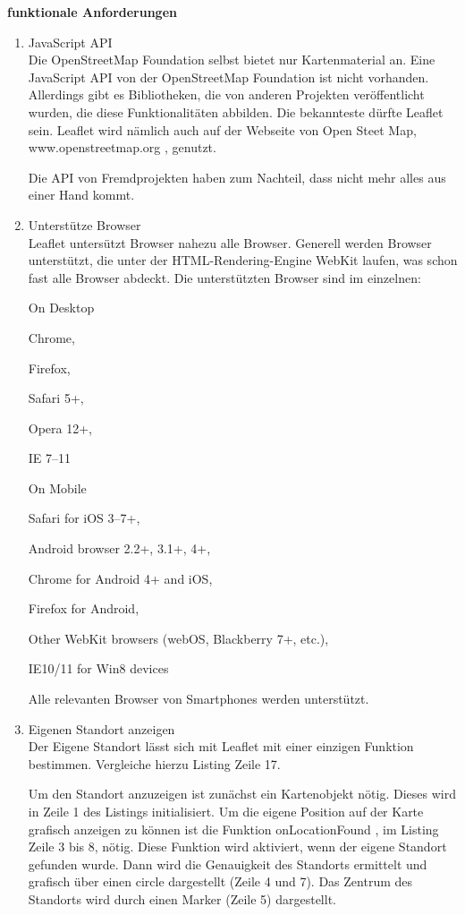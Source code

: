 \textbf{funktionale Anforderungen}
\begin{enumerate}
\item JavaScript API\\
Die OpenStreetMap Foundation selbst bietet nur Kartenmaterial an. Eine JavaScript API von der OpenStreetMap Foundation ist nicht vorhanden. Allerdings gibt es Bibliotheken, die von anderen Projekten veröffentlicht wurden, die diese Funktionalitäten abbilden. Die bekannteste dürfte \glqq Leaflet \grqq sein. Leaflet wird nämlich auch auf der Webseite von Open Steet Map, \glqq www.openstreetmap.org \grqq , genutzt.

Die API von Fremdprojekten haben zum Nachteil, dass nicht mehr alles aus einer Hand kommt.
\cite{gruber2015}

\item Unterstütze Browser\\
Leaflet untersützt Browser nahezu alle Browser. Generell werden Browser unterstützt, die unter der HTML-Rendering-Engine WebKit laufen, was schon fast alle Browser abdeckt. Die unterstützten Browser sind im einzelnen:

\glqq 
On Desktop

    Chrome,
    
    Firefox,
    
    Safari 5+,
    
    Opera 12+,
    
    IE 7–11

On Mobile

    Safari for iOS 3–7+,
    
    Android browser 2.2+, 3.1+, 4+,
    
    Chrome for Android 4+ and iOS,
    
    Firefox for Android,
    
    Other WebKit browsers (webOS, Blackberry 7+, etc.),
    
    IE10/11 for Win8 devices
\grqq
\cite{leaflet}

Alle relevanten Browser von Smartphones werden unterstützt.

\item Eigenen Standort anzeigen\\
Der Eigene Standort lässt sich mit Leaflet mit einer einzigen Funktion bestimmen. Vergleiche hierzu Listing Zeile 17. 

Um den Standort anzuzeigen ist zunächst ein Kartenobjekt nötig. Dieses wird in Zeile 1 des Listings initialisiert. Um die eigene Position auf der Karte grafisch anzeigen zu können ist die Funktion \glqq onLocationFound  \grqq, im Listing Zeile 3 bis 8,  nötig. Diese Funktion wird aktiviert, wenn der eigene Standort gefunden wurde. Dann wird die Genauigkeit des Standorts ermittelt und grafisch über einen circle dargestellt (Zeile 4 und 7). Das Zentrum des Standorts wird durch einen Marker (Zeile 5) dargestellt.


\end{enumerate}
